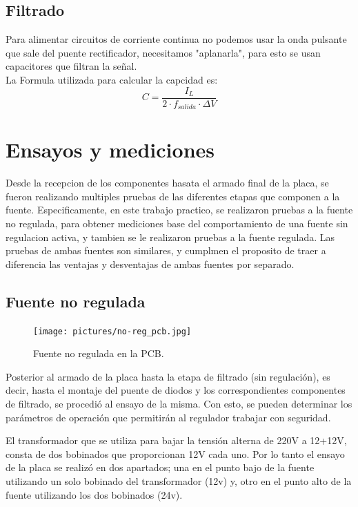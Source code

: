 \documentclass[chaptersright]{informeutn}
\begin{document}
      \section{Filtrado}
        Para alimentar circuitos de corriente continua no podemos usar la onda pulsante que sale del puente
        rectificador, necesitamos "aplanarla", para esto se usan capacitores que filtran la señal.\\ 
        La Formula utilizada para calcular la capcidad es:\\ 
        \begin{equation*}
            C=\frac{I_{L}}{2 \cdot f_{salida} \cdot \varDelta V}
        \end{equation*}

  \chapter{Ensayos y mediciones}
    Desde la recepcion de los componentes hasata el armado final de la placa, se fueron realizando multiples pruebas
    de las diferentes etapas que componen a la fuente. Especificamente, en este trabajo practico, se realizaron pruebas
    a la fuente no regulada, para obtener mediciones base del comportamiento de una fuente sin regulacion activa, y
    tambien se le realizaron pruebas a la fuente regulada. Las pruebas de ambas fuentes son similares, y cumplmen el
    proposito de traer a diferencia las ventajas y desventajas de ambas fuentes por separado.

    \section{Fuente no regulada}
      \begin{figure}
        \centering
        \texttt{[image: pictures/no-reg\_pcb.jpg]}
        \caption{Fuente no regulada en la PCB.}
      \end{figure}
      Posterior al armado de la placa hasta la etapa de filtrado (sin regulación), es decir, hasta el montaje del
      puente de diodos y los correspondientes componentes de filtrado, se procedió al ensayo de la misma. Con esto,
      se pueden determinar los parámetros de operación que permitirán al regulador trabajar con seguridad.

      El transformador que se utiliza para bajar la tensión alterna de 220V a 12+12V, consta de dos bobinados que
      proporcionan 12V cada uno. Por lo tanto el ensayo de la placa se realizó en dos apartados; una en el punto bajo
      de la fuente utilizando un solo bobinado del transformador (12v) y, otro en el punto alto de la fuente utilizando
      los dos bobinados (24v).
\end{document}
